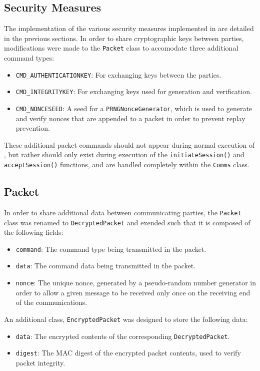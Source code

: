 \documentclass[a4paper,11pt]{article}
\begin{document}
\subsection{Security Measures}
The implementation of the various security measures implemented in 
\packageName{} are detailed in the previous sections. In order to share
cryptographic keys between parties, modifications were made to the 
\packageName{} \verb+Packet+ class to accomodate three additional command types:
\begin{itemize}
\item \verb+CMD_AUTHENTICATIONKEY+: For exchanging  
keys between the parties.
\item \verb+CMD_INTEGRITYKEY+: For exchanging  keys used for
 generation and 
verification.
\item \verb+CMD_NONCESEED+: A seed for a \verb+PRNGNonceGenerator+, 
which is used to generate and verify nonces that are appended to a packet in 
order to prevent replay prevention.
\end{itemize}

These additional packet commands should not appear during normal execution of 
\serviceName{}, but rather should only exist during execution of the
\verb+initiateSession()+ and \verb+acceptSession()+ functions, and are handled 
completely within the \verb+Comms+ class.

\subsection{Packet}
In order to share additional data between communicating parties, the 
\serviceName{} \verb+Packet+ class was renamed to \verb+DecryptedPacket+ and 
exended such that it is composed of the following fields:
\begin{itemize}
\item \verb+command+: The command type being transmitted in the 
packet.
\item \verb+data+: The command data being transmitted in the packet.
\item \verb+nonce+: The unique nonce, generated by a pseudo-random number 
generator in order to allow a given message to be received only once on the 
receiving end of the communications.
\end{itemize}

An additional class, \verb+EncryptedPacket+ was designed to store the following
data:
\begin{itemize}
\item \verb+data+: The encrypted contents of the corresponding 
\verb+DecryptedPacket+.
\item \verb+digest+: The MAC digest of the encrypted packet contents, used to 
verify packet integrity.
\end{itemize}
\end{document}

